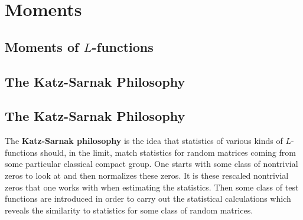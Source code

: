 \chapter{Moments}
  \section{Moments of \texorpdfstring{$L$}{L}-functions}
    \subsection*{}
    \subsection*{}
    \subsection*{}
  \section{The Katz-Sarnak Philosophy}
    \subsection*{}
    \subsection*{}
    \subsection*{}

  \iffalse
  \section{The Katz-Sarnak Philosophy}
    The \textbf{Katz-Sarnak philosophy} is the idea that statistics of various kinds of $L$-functions should, in the limit, match statistics for random matrices coming from some particular classical compact group. One starts with some class of nontrivial zeros to look at and then normalizes these zeros. It is these rescaled nontrivial zeros that one works with when estimating the statistics. Then some class of test functions are introduced in order to carry out the statistical calculations which reveals the similarity to statistics for some class of random matrices.
